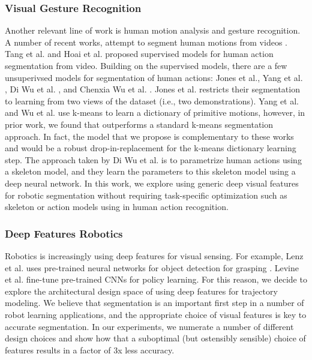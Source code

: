 \subsubsection{Visual Gesture Recognition}
Another relevant line of work is human motion analysis and gesture recognition.
A number of recent works, attempt to segment human motions from videos \cite{hoai2011joint, tang2012learning, yang2013discovering, jones2014unsupervised, wu2014leveraging, wu2015watch}.
Tang et al. and Hoai et al. proposed supervised models for human action segmentation from video.
Building on the supervised models, there are a few unsuperivsed models for segmentation of human actions: Jones et al.\cite{jones2014unsupervised}, Yang et al. \cite{yang2013discovering}, Di Wu et al. \cite{wu2014leveraging} , and Chenxia Wu et al. \cite{wu2015watch}.
Jones et al. \cite{jones2014unsupervised} restricts their segmentation to learning from two views of the dataset (i.e., two demonstrations).
Yang et al. \cite{yang2013discovering} and Wu et al.  \cite{wu2015watch} use k-means to learn a dictionary of primitive motions, however, in prior work, we found that \sys outperforms a standard k-means segmentation approach.
In fact, the model that we propose is complementary to these works and \sys would be a robust drop-in-replacement for the k-means dictionary learning step.
The approach taken by Di Wu et al. is to parametrize human actions using a skeleton model, and they learn the parameters to this skeleton model using a deep neural network.
In this work, we explore using generic deep visual features for robotic segmentation without requiring task-specific optimization such as skeleton or action models using in human action recognition.

\subsubsection{Deep Features Robotics}
Robotics is increasingly using deep features for visual sensing. For example, Lenz et al. uses pre-trained neural networks for object detection for grasping \cite{lenz2015deep}.
Levine et al. \cite{levine2015end} fine-tune pre-trained CNNs for policy learning.
For this reason, we decide to explore the architectural design space of using deep features for trajectory modeling.
We believe that segmentation is an important first step in a number of robot learning applications, and the appropriate choice of visual features is key to accurate segmentation.
In our experiments, we numerate a number of different design choices and show how that a suboptimal (but ostensibly sensible) choice of features results in a factor of 3x less accuracy.


